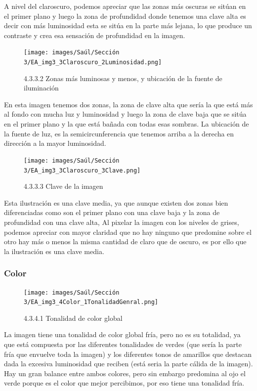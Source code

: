 \documentclass[12pt]{article}
\begin{document}
A nivel del claroscuro, podemos apreciar que las zonas más oscuras se sitúan en el primer plano y luego la zona de profundidad donde tenemos una clave alta es decir con más luminosidad esta se sitúa en la parte más lejana, lo que produce un contraste y crea esa sensación de profundidad en la imagen.

    \begin{figure}[H]
      \centering
      \texttt{[image: images/Saúl/Sección 3/EA\_img3\_3Claroscuro\_2Luminosidad.png]}
      \caption{\small 4.3.3.2 Zonas más luminosas y menos, y ubicación de la fuente de iluminación}
    \end{figure}

En esta imagen tenemos dos zonas, la zona de clave alta que sería la que está más al fondo con mucha luz y luminosidad y luego la zona de clave baja que se sitúa en el primer plano y la que está bañada con todas esas sombras. La ubicación de la fuente de luz, es la semicircunferencia que tenemos arriba a la derecha en dirección a la mayor luminosidad.

    \begin{figure}[H]
      \centering
      \texttt{[image: images/Saúl/Sección 3/EA\_img3\_3Claroscuro\_3Clave.png]}
      \caption{\small 4.3.3.3 Clave de la imagen}
    \end{figure}

Esta ilustración es una clave media, ya que aunque existen dos zonas bien diferenciadas como son el primer plano con una clave baja y la zona de profundidad con una clave alta, Al pixelar la imagen con los niveles de grises, podemos apreciar con mayor claridad que no hay ninguno que predomine sobre el otro hay más o menos la misma cantidad de claro que de oscuro, es por ello que la ilustración es una clave media.

        \subsubsection{Color}


    \begin{figure}[H]
      \centering
      \texttt{[image: images/Saúl/Sección 3/EA\_img3\_4Color\_1TonalidadGenral.png]}
      \caption{\small 4.3.4.1 Tonalidad de color global}
    \end{figure}

La imagen tiene una tonalidad de color global fría, pero no es su totalidad, ya que está compuesta por las diferentes tonalidades de verdes (que sería la parte fría que envuelve toda la imagen) y los diferentes tonos de amarillos que destacan dada la excesiva luminosidad que reciben (está seria la parte cálida de la imagen). Hay un gran balance entre ambos colores, pero sin embargo predomina al ojo el verde porque es el color que mejor percibimos, por eso tiene una tonalidad fría.
\end{document}
